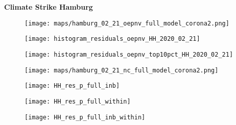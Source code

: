 \documentclass[11pt, a4paper]{article} %
\begin{document}
\newpage
\vspace*{\fill}
{\Huge \begin{center}\textbf{Climate Strike Hamburg}\end{center}}
\vspace*{\fill}\clearpage




\begin{figure}[H]\centering
	\texttt{[image: maps/hamburg\_02\_21\_oepnv\_full\_model\_corona2.png]}
	\begin{minipage}{\linewidth}
	\end{minipage}
\end{figure}


\begin{figure}[H]\centering
	\texttt{[image: histogram\_residuals\_oepnv\_HH\_2020\_02\_21]}
	\begin{minipage}{\linewidth}
	\end{minipage}
\end{figure}
\begin{figure}[H]\centering
	\texttt{[image: histogram\_residuals\_oepnv\_top10pct\_HH\_2020\_02\_21]}
	\begin{minipage}{\linewidth}
	\end{minipage}
\end{figure}



\begin{figure}[H]\centering
	\texttt{[image: maps/hamburg\_02\_21\_nc\_full\_model\_corona2.png]}
	\begin{minipage}{\linewidth}
	\end{minipage}
\end{figure}





\begin{figure}[H]\centering
	\texttt{[image: HH\_res\_p\_full\_inb]}
	\begin{minipage}{\linewidth}
	\end{minipage}
\end{figure}

\begin{figure}[H]\centering
	\texttt{[image: HH\_res\_p\_full\_within]}
	\begin{minipage}{\linewidth}
	\end{minipage}
\end{figure}
\begin{figure}[H]\centering
	\texttt{[image: HH\_res\_p\_full\_inb\_within]}
	\begin{minipage}{\linewidth}
	\end{minipage}
\end{figure}
\end{document}
